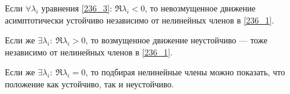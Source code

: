 \begin{to_thr}
	Если $\forall \lambda_i$ уравнения \eqref{236_3}: $\Re \lambda_i <0$, то невозмущенное движение асимптотически устойчиво независимо от нелинейных членов в \eqref{236_1}. 

	Если же $\exists \lambda_i: \ \Re \lambda_i >0$, то возмущенное движение неустойчиво --- тоже независимо от нелинейных членов в \eqref{236_1}. 

	Если же $\exists \lambda_i: \ \Re \lambda_i = 0$, то подбирая нелинейные члены можно показать, что положение как устойчиво, так и неустойчиво.
\end{to_thr}

